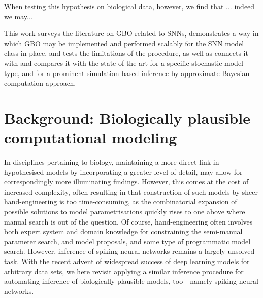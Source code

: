 \documentclass[mphil,deptreport,ianc]{infthesis} %
\begin{document}
When testing this hypothesis on biological data, however, we find that ...
indeed we may...

This work surveys the literature on GBO related to SNNs, demonstrates a way in which GBO may be implemented and performed scalably for the SNN model class in-place, and tests the limitations of the procedure, as well as connects it with and compares it with the state-of-the-art for a specific stochastic model type, and for a prominent simulation-based inference by approximate Bayesian computation approach.


\chapter{Background: Biologically plausible computational modeling}\label{chpt:background}

In disciplines pertaining to biology, maintaining a more direct link in hypothesised models by incorporating a greater level of detail, may allow for correspondingly more illuminating findings.
However, this comes at the cost of increased complexity, often resulting in that construction of such models by sheer hand-engineering is too time-consuming, as the combinatorial expansion of possible solutions to model parametrisations quickly rises to one above where manual search is out of the question.
Of course, hand-engineering often involves both expert system and domain knowledge for constraining the semi-manual parameter search, and model proposals, and some type of programmatic model search.
However, inference of spiking neural networks remains a largely unsolved task.
With the recent advent of widespread success of deep learning models for arbitrary data sets, we here revisit applying a similar inference procedure for automating inference of biologically plausible models, too - namely spiking neural networks.
\end{document}
